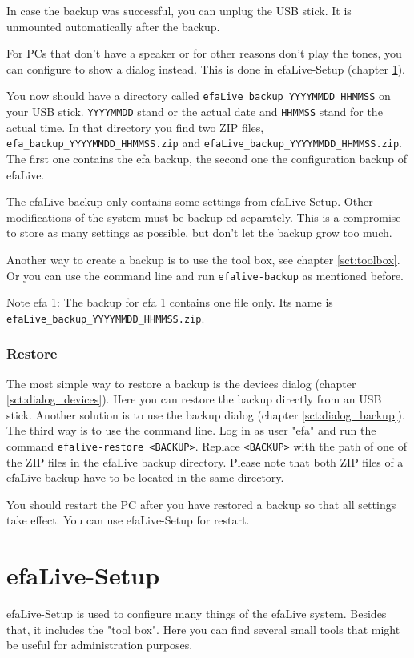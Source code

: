 \documentclass[a4paper,12pt,twoside]{article}
\begin{document}
In case the backup was successful, you can unplug the USB stick. It is
unmounted automatically after the backup.

For PCs that don't have a speaker or for other reasons
don't play the tones, you can configure to show a
dialog instead. This is done in efaLive-Setup (chapter \ref{sct:efalivesetup}).

You now should have a directory called
\texttt{efaLive\_backup\_YYYYMMDD\_HHMMSS} on your
USB stick. \texttt{YYYYMMDD} stand or the actual
date and \texttt{HHMMSS} stand for the actual
time. In that directory you find two ZIP files,
\texttt{efa\_backup\_YYYYMMDD\_HHMMSS.zip} and
\texttt{efaLive\_backup\_YYYYMMDD\_HHMMSS.zip}.
The first one contains the efa backup, the second one the configuration
backup of efaLive.

The efaLive backup only contains some settings from efaLive-Setup. Other
modifications of the system must be backup-ed separately. This is a
compromise to store as many settings as possible, but
don't let the backup grow too much.

Another way to create a backup is to use the tool box, see chapter \ref{sct:toolbox}. Or
you can use the command line and run
\texttt{efalive-backup} as mentioned before.

Note efa 1: The backup for efa 1 contains one file only. Its name is\\
 \texttt{efaLive\_backup\_YYYYMMDD\_HHMMSS.zip}.


\subsubsection{Restore}
\label{sct:restore}
The most simple way to restore a backup is the devices dialog (chapter
\ref{sct:dialog_devices}). Here you can restore the backup directly from an USB stick.
Another solution is to use the backup dialog (chapter \ref{sct:dialog_backup}). The third
way is to use the command line. Log in as user
"efa" and run the command
\texttt{efalive-restore {\textless}BACKUP{\textgreater}}. Replace
\texttt{{\textless}BACKUP{\textgreater}} with the
path of one of the ZIP files in the efaLive backup directory. Please
note that both ZIP files of a efaLive backup have to be located in the
same directory.

You should restart the PC after you have restored a backup so that all
settings take effect. You can use efaLive-Setup for restart.


\section{efaLive-Setup}
\label{sct:efalivesetup}
efaLive-Setup is used to configure
many things of the efaLive system. Besides that, it includes the
"tool box". Here you can find several small
tools that might be useful for administration purposes.
\end{document}
